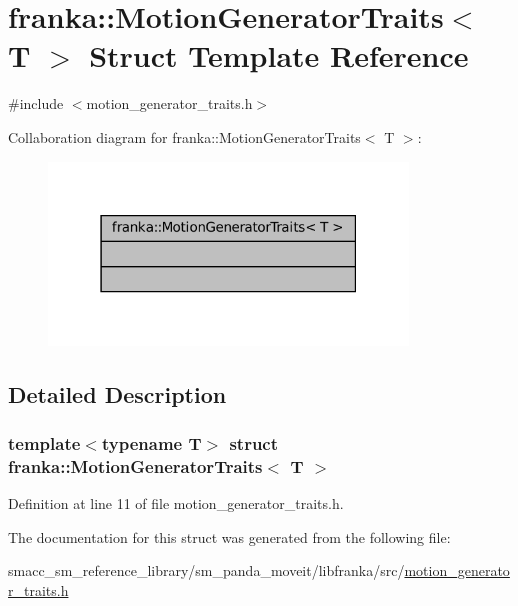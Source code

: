 \hypertarget{structfranka_1_1MotionGeneratorTraits}{}\section{franka\+:\+:Motion\+Generator\+Traits$<$ T $>$ Struct Template Reference}
\label{structfranka_1_1MotionGeneratorTraits}


{\ttfamily \#include $<$motion\+\_\+generator\+\_\+traits.\+h$>$}



Collaboration diagram for franka\+:\+:Motion\+Generator\+Traits$<$ T $>$\+:
\nopagebreak
\begin{figure}[H]
\begin{center}
\leavevmode
\includegraphics[width=271pt]{structfranka_1_1MotionGeneratorTraits__coll__graph}
\end{center}
\end{figure}


\subsection{Detailed Description}
\subsubsection*{template$<$typename T$>$\newline
struct franka\+::\+Motion\+Generator\+Traits$<$ T $>$}



Definition at line 11 of file motion\+\_\+generator\+\_\+traits.\+h.



The documentation for this struct was generated from the following file\+:\begin{DoxyCompactItemize}
\item 
smacc\+\_\+sm\+\_\+reference\+\_\+library/sm\+\_\+panda\+\_\+moveit/libfranka/src/\hyperlink{motion__generator__traits_8h}{motion\+\_\+generator\+\_\+traits.\+h}\end{DoxyCompactItemize}
